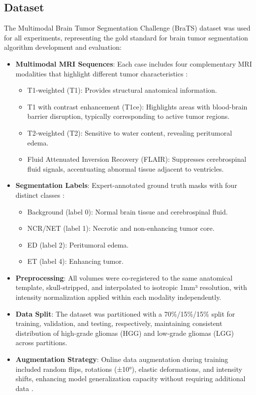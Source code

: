\documentclass[12pt,a4paper]{article}
\begin{document}
\subsection{Dataset}
The Multimodal Brain Tumor Segmentation Challenge (BraTS) dataset was used for all experiments, representing the gold standard for brain tumor segmentation algorithm development and evaluation:

\begin{itemize}
    \item \textbf{Multimodal MRI Sequences}: Each case includes four complementary MRI modalities that highlight different tumor characteristics \cite{Bakas2017}:
    \begin{itemize}
        \item T1-weighted (T1): Provides structural anatomical information.
        \item T1 with contrast enhancement (T1ce): Highlights areas with blood-brain barrier disruption, typically corresponding to active tumor regions.
        \item T2-weighted (T2): Sensitive to water content, revealing peritumoral edema.
        \item Fluid Attenuated Inversion Recovery (FLAIR): Suppresses cerebrospinal fluid signals, accentuating abnormal tissue adjacent to ventricles.
    \end{itemize}
    
    \item \textbf{Segmentation Labels}: Expert-annotated ground truth masks with four distinct classes \cite{Menze2015}:
    \begin{itemize}
        \item Background (label 0): Normal brain tissue and cerebrospinal fluid.
        \item NCR/NET (label 1): Necrotic and non-enhancing tumor core.
        \item ED (label 2): Peritumoral edema.
        \item ET (label 4): Enhancing tumor.
    \end{itemize}
    
    \item \textbf{Preprocessing}: All volumes were co-registered to the same anatomical template, skull-stripped, and interpolated to isotropic 1mm³ resolution, with intensity normalization applied within each modality independently.
    
    \item \textbf{Data Split}: The dataset was partitioned with a 70\%/15\%/15\% split for training, validation, and testing, respectively, maintaining consistent distribution of high-grade gliomas (HGG) and low-grade gliomas (LGG) across partitions.
    
    \item \textbf{Augmentation Strategy}: Online data augmentation during training included random flips, rotations (±10°), elastic deformations, and intensity shifts, enhancing model generalization capacity without requiring additional data \cite{Isensee2021}.
\end{itemize}
\end{document}
